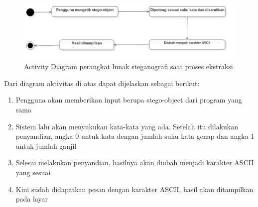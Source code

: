 \begin{figure}[H]
	\centering
	\includegraphics[scale=0.5]{Gambar/activity-ekstraksi}
	\caption{Activity Diagram perangkat lunak steganografi saat proses ekstraksi} 
	\label{fig:4_activity-ekstraksi}
\end{figure}

Dari diagram aktivitas di atas dapat dijelaskan sebagai berikut:

\begin{enumerate}
	\item Pengguna akan memberikan input berupa stego-object dari program yang sama
	\item Sistem lalu akan menyukukan kata-kata yang ada. Setelah itu dilakukan penyandian, angka 0 untuk kata dengan jumlah suku kata genap dan angka 1 untuk jumlah ganjil
	\item Selesai melakukan penyandian, hasilnya akan diubah menjadi karakter ASCII yang sesuai
	\item Kini sudah didapatkan pesan dengan karakter ASCII, hasil akan ditampilkan pada layar
\end{enumerate}